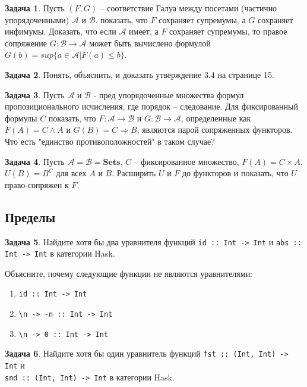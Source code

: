 \documentclass[10pt]{article}
\theoremstyle{definition}
\newtheorem{Pm}{Задача}[subsection]
\begin{document}
\begin{Pm}
    Пусть $(F, G)$ -- соответствие Галуа между посетами (частично упорядоченными) $\mathcal A$ и $\mathcal B$. показать, что $F$ сохраняет супремумы, а $G$ сохраняет инфимумы. Доказать, что если $\mathcal A$ имеет, а $F$ сохраняет супремумы, то правое сопряжение $G : \mathcal B \rightarrow \mathcal A$ может быть вычислено формулой $G(b) = sup \{a \in \mathcal A | F(a) \leq b \}$.
\end{Pm}

\begin{Pm}
    Понять, объяснить, и доказать утверждение 3.4 на странице 15.
\end{Pm}

\begin{Pm}
    Пусть $\mathcal A$ и $\mathcal B$ - пред упорядоченные множества формул пропозиционального исчисления, где порядок -- следование. Для фиксированный формулы $C$ показать, что $F : \mathcal A \rightarrow \mathcal B$ и $G : \mathcal B \rightarrow \mathcal A$, определенные как $F(A) = C \land A$ и $G(B) = C \Rightarrow B$, являются парой сопряженных функторов. Что есть "единство противоположностей" в таком случае?
\end{Pm}

\begin{Pm}
    Пусть $\mathcal A = \mathcal B = \mathbf{Sets}$, $C$ -- фиксированное множество, $F(A) = C \times A$, $U(B) = B^C$ для всех $A$ и $B$. Расширить $U$ и $F$ до функторов и показать, что $U$ право-сопряжен к $F$.
\end{Pm}

\subsection{Пределы}

\begin{Pm}
    Найдите хотя бы два уравнителя функций \verb|id :: Int -> Int| и \verb|abs :: Int -> Int| в категории Hask.
    
    Объясните, почему следующие функции не являются уравнителями:
    \begin{enumerate}
        \item \verb|id :: Int -> Int|
        \item \verb|\n -> -n :: Int -> Int|
        \item \verb|\n -> 0 :: Int -> Int|
    \end{enumerate}
\end{Pm}

\begin{Pm}
    Найдите хотя бы один уравнитель функций \verb|fst :: (Int, Int) -> Int| и \\ \verb|snd :: (Int, Int) -> Int| в категории Hask.
\end{Pm}
\end{document}
